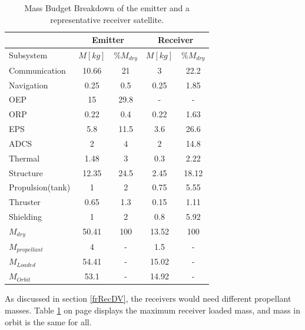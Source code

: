 \begin{table}[h!]
\centering
\begin{tabular}{|l|c|c|c|c|}
\hline
 & \multicolumn{2}{|c|}{Emitter} & \multicolumn{2}{|c|}{Receiver} \\\hline
 Subsystem        & $M [kg]$ & \%$M_{dry}$ & $M [kg]$ & \%$M_{dry}$ \\\hline\hline
 Communication    & 10.66    & 21          & 3        & 22.2 \\\hline
 Navigation       & 0.25     & 0.5         & 0.25     & 1.85 \\\hline
 OEP              & 15       & 29.8        & -        & - \\\hline
 ORP              & 0.22     & 0.4         & 0.22     & 1.63 \\\hline
 EPS              & 5.8      & 11.5        & 3.6      & 26.6 \\\hline
 ADCS             & 2        & 4           & 2        & 14.8 \\\hline
 Thermal          & 1.48     & 3           & 0.3      & 2.22 \\\hline
 Structure        & 12.35    & 24.5        & 2.45     & 18.12 \\\hline
 Propulsion(tank) & 1        & 2           & 0.75     & 5.55 \\\hline
 Thruster         & 0.65     & 1.3         & 0.15     & 1.11 \\\hline
 Shielding        & 1        & 2           & 0.8      & 5.92 \\\hline\hline
 $M_{dry}$        & 50.41    & 100         & 13.52    & 100 \\\hline
 $M_{propellant}$ & 4        & -           & 1.5      & - \\\hline
 $M_{Loaded}$     & 54.41    & -           & 15.02    & - \\\hline
 $M_{Orbit}$      & 53.1     & -           & 14.92    & - \\\hline
\end{tabular}
\caption{Mass Budget Breakdown of the emitter and a representative receiver satellite.}
\label{tab:MB}
\end{table}

As discussed in section \ref{frRecDV}, the receivers would need different propellant masses. Table \ref{tab:MB} on page \pageref{tab:MB} displays the maximum receiver loaded mass, and mass in orbit is the same for all.

